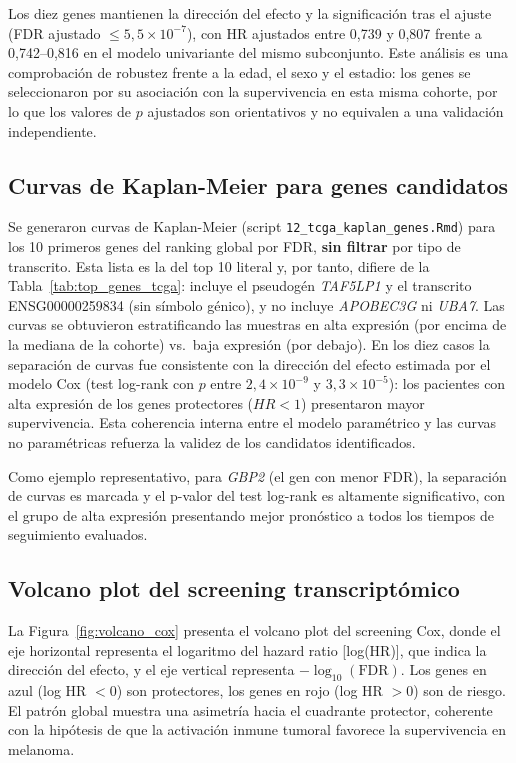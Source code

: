 Los diez genes mantienen la dirección del efecto y la significación tras el ajuste (FDR ajustado $\leq 5{,}5\times10^{-7}$), con HR ajustados entre 0,739 y 0,807 frente a 0,742--0,816 en el modelo univariante del mismo subconjunto. Este análisis es una comprobación de robustez frente a la edad, el sexo y el estadio: los genes se seleccionaron por su asociación con la supervivencia en esta misma cohorte, por lo que los valores de $p$ ajustados son orientativos y no equivalen a una validación independiente.



\subsection{Curvas de Kaplan-Meier para genes candidatos}

Se generaron curvas de Kaplan-Meier (script \texttt{12\_tcga\_kaplan\_genes.Rmd}) para los 10 primeros genes del ranking global por FDR, \textbf{sin filtrar} por tipo de transcrito. Esta lista es la del top 10 literal y, por tanto, difiere de la Tabla~\ref{tab:top_genes_tcga}: incluye el pseudogén \textit{TAF5LP1} y el transcrito ENSG00000259834 (sin símbolo génico), y no incluye \textit{APOBEC3G} ni \textit{UBA7}. Las curvas se obtuvieron estratificando las muestras en alta expresión (por encima de la mediana de la cohorte) vs.\ baja expresión (por debajo). En los diez casos la separación de curvas fue consistente con la dirección del efecto estimada por el modelo Cox (test log-rank con $p$ entre $2{,}4\times10^{-9}$ y $3{,}3\times10^{-5}$): los pacientes con alta expresión de los genes protectores ($HR < 1$) presentaron mayor supervivencia. Esta coherencia interna entre el modelo paramétrico y las curvas no paramétricas refuerza la validez de los candidatos identificados.

Como ejemplo representativo, para \textit{GBP2} (el gen con menor FDR), la separación de curvas es marcada y el p-valor del test log-rank es altamente significativo, con el grupo de alta expresión presentando mejor pronóstico a todos los tiempos de seguimiento evaluados.

\subsection{Volcano plot del screening transcriptómico}

La Figura~\ref{fig:volcano_cox} presenta el volcano plot del screening Cox, donde el eje horizontal representa el logaritmo del hazard ratio [log(HR)], que indica la dirección del efecto, y el eje vertical representa $-\log_{10}(\text{FDR})$. Los genes en azul (log HR $< 0$) son protectores, los genes en rojo (log HR $> 0$) son de riesgo. El patrón global muestra una asimetría hacia el cuadrante protector, coherente con la hipótesis de que la activación inmune tumoral favorece la supervivencia en melanoma.

